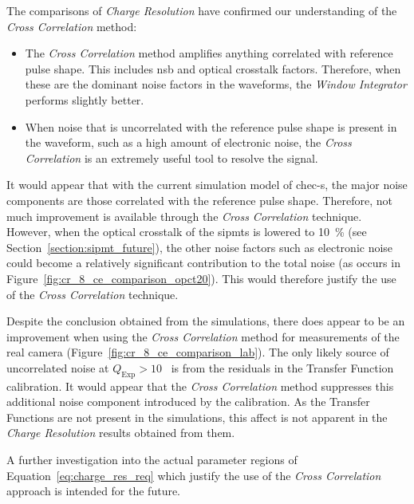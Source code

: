 The comparisons of \textit{Charge Resolution} have confirmed our understanding of the \textit{Cross Correlation} method:
\begin{itemize}
\item The \textit{Cross Correlation} method amplifies anything correlated with reference pulse shape. This includes \gls{nsb} and optical crosstalk factors. Therefore, when these are the dominant noise factors in the waveforms, the \textit{Window Integrator} performs slightly better.
\item When noise that is uncorrelated with the reference pulse shape is present in the waveform, such as a high amount of electronic noise, the \textit{Cross Correlation} is an extremely useful tool to resolve the signal.
\end{itemize}
It would appear that with the current simulation model of \gls{chec-s}, the major noise components are those correlated with the reference pulse shape. Therefore, not much improvement is available through the \textit{Cross Correlation} technique. However, when the optical crosstalk of the \glspl{sipmt} is lowered to \SI{10}{\percent} (see Section~\ref{section:sipmt_future}), the other noise factors such as electronic noise could become a relatively significant contribution to the total noise (as occurs in Figure~\ref{fig:cr_8_ce_comparison_opct20}). This would therefore justify the use of the \textit{Cross Correlation} technique. 

Despite the conclusion obtained from the simulations, there does appear to be an improvement when using the \textit{Cross Correlation} method for measurements of the real camera (Figure~\ref{fig:cr_8_ce_comparison_lab}). The only likely source of uncorrelated noise at $Q_\text{Exp} > 10$~\si{\pe} is from the residuals in the Transfer Function calibration. It would appear that the \textit{Cross Correlation} method suppresses this additional noise component introduced by the calibration.  As the Transfer Functions are not present in the simulations, this affect is not apparent in the \textit{Charge Resolution} results obtained from them.

A further investigation into the actual parameter regions of Equation~\ref{eq:charge_res_req} which justify the use of the \textit{Cross Correlation} approach is intended for the future.